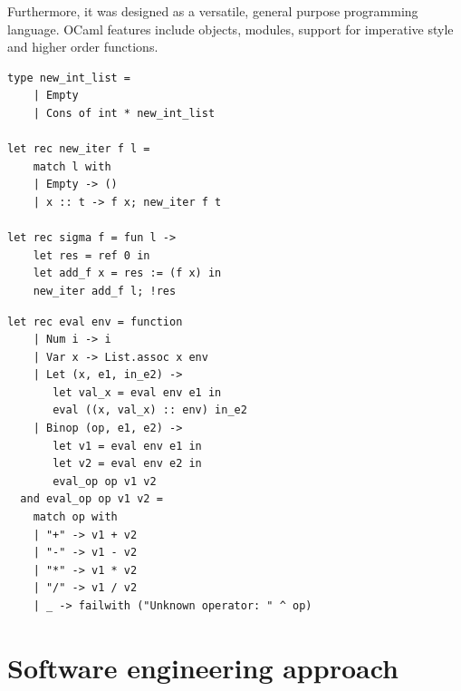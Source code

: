 \documentclass[12pt,twoside,notitlepage]{report}
\begin{document}
Furthermore, it was designed as a versatile, general purpose programming language. OCaml features include objects, modules, support for imperative style and higher order functions.
\vspace{3mm}

\begin{minipage}{\linewidth}

\begin{lstlisting}[caption={OCaml imperative function example}]
type new_int_list =
    | Empty
    | Cons of int * new_int_list
    
let rec new_iter f l = 
	match l with 
	| Empty -> ()
	| x :: t -> f x; new_iter f t

let rec sigma f = fun l -> 
    let res = ref 0 in 
    let add_f x = res := (f x) in 
    new_iter add_f l; !res
\end{lstlisting}

\end{minipage}

    
\begin{minipage}{\linewidth}

\begin{lstlisting}[caption={OCaml evaluation function example}]    
let rec eval env = function
    | Num i -> i
    | Var x -> List.assoc x env
    | Let (x, e1, in_e2) ->
       let val_x = eval env e1 in
       eval ((x, val_x) :: env) in_e2
    | Binop (op, e1, e2) ->
       let v1 = eval env e1 in
       let v2 = eval env e2 in
       eval_op op v1 v2
  and eval_op op v1 v2 =
    match op with
    | "+" -> v1 + v2
    | "-" -> v1 - v2
    | "*" -> v1 * v2
    | "/" -> v1 / v2
    | _ -> failwith ("Unknown operator: " ^ op)
\end{lstlisting}

\end{minipage}

\section{Software engineering approach}
\end{document}
